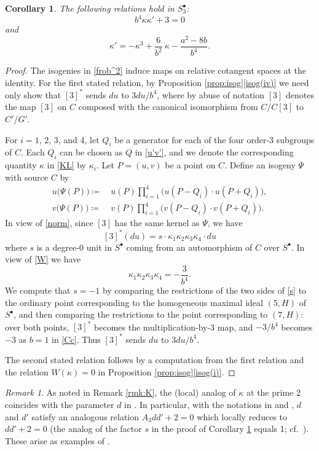 \documentclass{gtpart}
\newtheorem{cor}[thm]{Corollary}
\theoremstyle{definition}
\theoremstyle{remark}
\newtheorem{rmk}[thm]{Remark}
\newcommand{\K}{\kappa}
\newcommand{\s}{S^\bullet}
\newcommand{\isog}[1]{Proposition \ref{prop:isog}\thinspace \eqref{isog(#1)}}
\begin{document}
\begin{cor}
\label{cor:K'}
 The following relations hold in $\s_3$: 
 \[
  b^4 \K \K' + 3 = 0 
 \]
 and 
 \[
  \K' = -\K^3 + \frac{6}{b^2} ~ \K - \frac{a^2 - 8 b}{b^4}.  
 \]
\end{cor}
\begin{proof}
 The isogenies in \eqref{frob^2} induce maps on relative cotangent 
 spaces at the identity.  For the first stated relation, by \isog{iv} we 
 need only show that $[3]^*$ sends $du$ to $3 du / b^4$, where by abuse 
 of notation $[3]$ denotes the map $[3]$ on $C$ composed with the 
 canonical isomorphism from $C/C[3]$ to $C'/G'$.  

 For $i = 1$, 2, 3, and 4, let $Q_i$ be a generator for each of the four 
 order-3 subgroups of $C$.  Each $Q_i$ can be chosen as $Q$ in 
 \eqref{u'v'}, and we denote the corresponding quantity $\K$ in 
 \eqref{KL} by $\K_i$.  Let $P = (u,v)$ be a point on $C$.  Define an 
 isogeny $\Psi$ with source $C$ by 
 \begin{equation*}
 \begin{split}
  u\big( \Psi(P) \big) \coloneqq & ~ u(P) \prod_{i=1}^4 \big( u(P-Q_i) \cdot u(P+Q_i) \big), \\
  v\big( \Psi(P) \big) \coloneqq & ~ v(P) \prod_{i=1}^4 \big( v(P-Q_i) \cdot v(P+Q_i) \big).  
 \end{split}
 \end{equation*}
 In view of \eqref{norm}, since $[3]$ has the same kernel as $\Psi$, we 
 have 
 \begin{equation}
 \label{s}
  [3]^* (du) = s \cdot \K_1 \K_2 \K_3 \K_4 \cdot du 
 \end{equation}
 where $s$ is a degree-0 unit in $\s$ coming from an automorphism of $C$ 
 over $\s$.  In view of \eqref{W} we have 
 \[
  \K_1 \K_2 \K_3 \K_4 = -\frac{3}{b^4}.  
 \]
 We compute that $s = -1$ by comparing the restrictions of the two sides 
 of \eqref{s} to the ordinary point corresponding to the homogeneous 
 maximal ideal $(5,H)$ of $\s$, and then comparing the restrictions to 
 the point corresponding to $(7,H)$: over both points, $[3]^*$ becomes 
 the multiplication-by-3 map, and $-3 / b^4$ becomes $-3$ as $b = 1$ in 
 \eqref{Cc}.  Thus $[3]^*$ sends $du$ to $3 du / b^4$.  

 The second stated relation follows by a computation from the first 
 relation and the relation $W(\K) = 0$ in \isog{i}.  
\end{proof}

\begin{rmk}
\label{rmk:KK'}
 As noted in Remark \ref{rmk:K}, the (local) analog of $\K$ at the prime 
 2 coincides with the parameter $d$ in \cite[Section 3]{h2p2}.  In 
 particular, with the notations in \cite[Section 3]{h2p2} and 
 \cite[Proposition 3.2]{tmf3}, $d$ and $d'$ satisfy an analogous 
 relation $A_3 d d' + 2 = 0$ which locally reduces to $d d' + 2 = 0$ 
 (the analog of the factor $s$ in the proof of Corollary \ref{cor:K'} 
 equals 1; cf.~\cite[Theorem 2.6.4]{andoduke}).  These arise as examples 
 of \cite[Lemma 3.21]{poonen}.  
\end{rmk}
\end{document}
